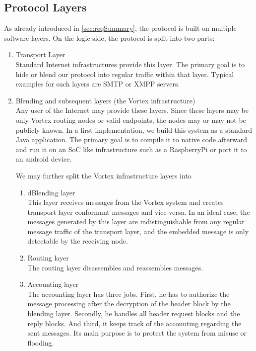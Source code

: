 \subsection{Protocol Layers}
As already introduced in \ref{sec:reqSummary}, the protocol is built on multiple software layers. On the logic side, the protocol is split into two parts:
\begin{enumerate}
	\item Transport Layer\\
	Standard Internet infrastructures provide this layer. The primary goal is to hide or blend our protocol into regular traffic within that layer. Typical examples for such layers are SMTP or XMPP servers.
	\item Blending and subsequent layers (the Vortex infrastructure)\\
	Any user of the Internet may provide these layers. Since these layers may be only Vortex routing nodes or valid endpoints, the nodes may or may not be publicly known. In a first implementation, we build this system as a standard Java application. The primary goal is to compile it to native code afterward and run it on an SoC like infrastructure such as a RaspberryPi or port it to an android device.
	
	We may further split the Vortex infrastructure layers into
	\begin{enumerate}
		\item dBlending layer\\
		This layer receives messages from the Vortex system and creates transport layer conformant messages and vice-versa. In an ideal case, the messages generated by this layer are indistinguishable from any regular message traffic of the transport layer, and the embedded message is only detectable by the receiving node.
		\item Routing layer\\
		The routing layer disassembles and reassembles messages. 
		\item Accounting layer\\
		The accounting layer has three jobs. First, he has to authorize the message processing after the decryption of the header block by the blending layer. Secondly, he handles all header request blocks and the reply blocks. And third, it keeps track of the accounting regarding the sent messages. Its main purpose is to protect the system from misuse or flooding.    
	\end{enumerate}
\end{enumerate}

